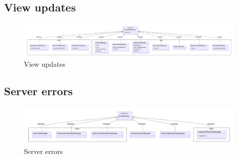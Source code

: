 \documentclass[12pt]{article}
\begin{document}
\subsection{View updates}
\begin{figure}[H]
    \begin{center}
        \includegraphics[scale=0.2]{class_diagram_message_viewing_updates.png}
        \caption{View updates}
    \end{center}
\end{figure}

\subsection{Server errors}
\begin{figure}[H]
    \begin{center}
        \includegraphics[scale=0.2]{class_diagram_message_server_errors.png}
        \caption{Server errors}
    \end{center}
\end{figure}
\end{document}
